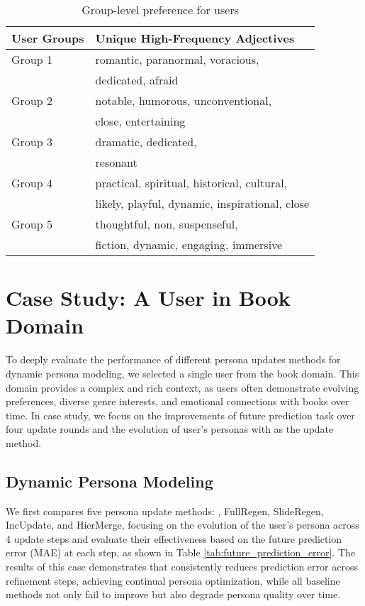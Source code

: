 \begin{table}[h]
  \small
  \centering
  \caption{Group-level preference for users}
  \begin{tabular}{lp{5cm}} %
  \toprule
  \textbf{User Groups}    & \textbf{Unique High-Frequency Adjectives}  \\
  \midrule
  Group 1    & romantic, paranormal, voracious, \\  %
             & dedicated, afraid                                    \\ \midrule
  Group 2    & notable, humorous, unconventional, \\  %
             & close, entertaining                                \\ \midrule
  Group 3    & dramatic, dedicated, \\   %
             & resonant                                                         \\ \midrule
  Group 4    & practical, spiritual, historical, cultural, \\ %
             & likely, playful, dynamic, inspirational, close \\ \midrule
  Group 5    & thoughtful, non, suspenseful, \\   %
             & fiction, dynamic, engaging, immersive                   \\ 
  \bottomrule
  \end{tabular}
  \label{tab:group_user}
\end{table}
      

\clearpage
\section{Case Study: A User in Book Domain}
To deeply evaluate the performance of different persona updates methods for dynamic persona modeling, we selected a single user from the book domain. This domain provides a complex and rich context, as users often demonstrate evolving preferences, diverse genre interests, and emotional connections with books over time. In case study, we focus on the improvements of future prediction task over four update rounds and the evolution of user's personas with \method as the update method.
\subsection{Dynamic Persona Modeling}
We first compares five persona update methods: \method, FullRegen, SlideRegen, IncUpdate, and HierMerge, focusing on the evolution of the user’s persona across 4 update steps and evaluate their effectiveness based on the future prediction error (MAE) at each step, as shown in Table \ref{tab:future_prediction_error}. 
 The results of this case demonstrates that \method consistently reduces prediction error across refinement steps, achieving continual persona optimization, while all baseline methods not only fail to improve but also degrade persona quality over time.


